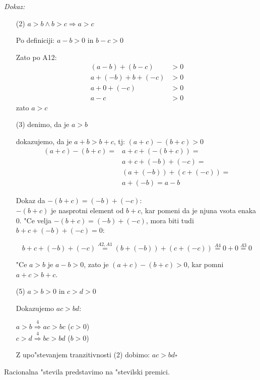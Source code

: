 \emph{Dokaz:}
\begin{enumerate}
	\item[(2)] \(a > b \land b > c \Rightarrow a > c\)
	
	Po definiciji: \(a - b > 0\) in \(b - c > 0\)
	
	Zato po A12:
	\begin{align*}
		(a -b) + (b -c) &> 0\\
		a + (-b) + b + (-c) &> 0\\
		a + 0 + (-c) &> 0 \\
		a - c &> 0
	\end{align*}
	zato \(a > c\)
	
	\item[(3)] denimo, da je \(a > b\)
	
	dokazujemo, da je \(a + b > b + c\), tj: \((a + c) - (b + c) > 0\)
	\begin{align*}
		(a + c) - (b + c) = &a + c + (-(b + c)) =\\
		&a + c + (-b) + (-c) = \\
		&(a + (-b)) + (c + (-c)) =\\
		&a + (-b) = a - b
	\end{align*}
	\begin{adjustwidth}{24pt}{0pt}
		Dokaz da \(-(b + c) = (-b) + (-c)\):\\
		\hspace*{12pt}\(-(b + c)\) je nasprotni element od \(b + c\), kar pomeni da je njuna vsota enaka \(0\). "Ce velja \(-(b + c) = (-b) + (-c)\), mora biti tudi \(b + c + (-b) + (-c) = 0\):
	\end{adjustwidth}
	\[b + c + (-b) + (-c) \stackrel{A2, A1}{=} (b + (-b)) + (c + (-c)) \stackrel{A4}{=} 0 + 0 \stackrel{A3}{=} 0\]
	
	"Ce \(a > b\) je \(a - b > 0\), zato je \((a + c) - (b + c) > 0\), kar pomni \(a + c > b + c\).
	
	\item[(5)] \(a > b > 0\) in \(c > d > 0\)
	
	Dokazujemo \(ac > bd\):
	
	\(a > b \stackrel{4}{\Rightarrow} ac > bc\) (\(c > 0\))\\
	\(c > d \stackrel{4}{\Rightarrow} bc > bd\) (\(b > 0\))
	
	Z upo"stevanjem tranzitivnosti (2) dobimo: \(ac > bd \square \)
\end{enumerate}

Racionalna "stevila predstavimo na "stevilski premici.

